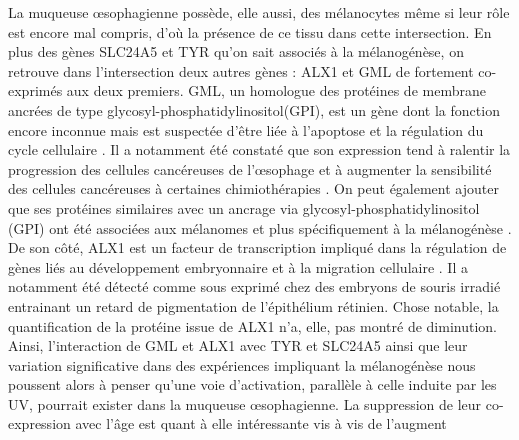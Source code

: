 La muqueuse œsophagienne possède, elle aussi, des mélanocytes même si leur rôle est encore mal compris, d'où la présence de ce tissu dans cette intersection.
En plus des gènes SLC24A5 et TYR qu'on sait associés à la mélanogénèse, on retrouve dans l'intersection deux autres gènes : ALX1 et GML de fortement co-exprimés aux deux premiers. GML, un homologue des protéines de membrane ancrées de type glycosyl-phosphatidylinositol(GPI), est un gène dont la fonction encore inconnue mais est suspectée d'être liée à l'apoptose et la régulation du cycle cellulaire \cite{Furuhata1996Nov}. Il a notamment été constaté que son expression tend à ralentir la progression des cellules cancéreuses de l'œsophage et à augmenter la sensibilité des cellules cancéreuses à certaines chimiothérapies \cite{Catalano2001May}. On peut également ajouter que ses protéines similaires avec un ancrage via glycosyl-phosphatidylinositol (GPI) ont été associées aux mélanomes \cite{Food1994Jan} et plus spécifiquement à la mélanogénèse \cite{Okamura2017Feb}. 
De son côté, ALX1 est un facteur de transcription impliqué dans la régulation de gènes liés au développement embryonnaire et à la migration cellulaire \cite{Dee2013Jan}. Il a notamment été détecté comme sous exprimé chez des embryons de souris irradié entrainant un retard de pigmentation de l'épithélium rétinien. Chose notable, la quantification de la protéine issue de ALX1 n'a, elle, pas montré de diminution.
Ainsi, l'interaction de GML et ALX1 avec TYR et SLC24A5 ainsi que leur variation significative dans des expériences impliquant la mélanogénèse nous poussent alors à penser qu'une voie d'activation, parallèle à celle induite par les UV, pourrait exister dans la muqueuse œsophagienne. La suppression de leur co-expression avec l'âge est quant à elle intéressante vis à vis de l'augment
